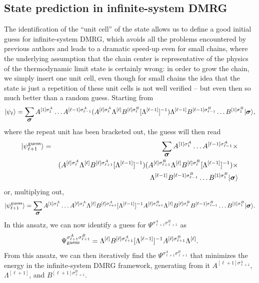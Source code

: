 \documentclass[a4paper,10pt,oneside,onecolumn,1p,times]{elsarticle}
\newcommand{\ket}[1]{\mbox{$| #1  \rangle$}}
\newcommand{\fat}[1]{\mbox{\boldmath$#1$\unboldmath}}	%
\begin{document}
\subsection{State prediction in infinite-system DMRG} 
The identification of the ``unit cell'' of the state allows us to define a good initial guess for infinite-system DMRG\cite{McCulloch08}, which avoids all the problems encountered by previous authors and leads to a dramatic speed-up even for small chains, where the underlying assumption that the chain center is representative of the physics of the thermodynamic limit state is certainly wrong: in order to grow the chain, we simply insert one unit cell, even though for small chains the idea that the state is just a repetition of these unit cells is not well verified -- but even then so much better than a random guess. Starting from
\begin{equation}
\ket{\psi_{\ell}} =  \sum_{\fat{\sigma}} A^{[1]\sigma_1^A} \ldots A^{[\ell-1]\sigma_{\ell-1}^A} (A^{[\ell]\sigma_\ell^A} \Lambda^{[\ell]} B^{[\ell]\sigma_\ell^B} [\Lambda^{[\ell-1]}]^{-1}) \Lambda^{[\ell-1]} B^{[\ell-1]\sigma_{\ell-1}^B} \ldots B^{[1]\sigma_1^B} \ket{\fat{\sigma}},
\end{equation} 
where the repeat unit has been bracketed out, the guess will then read
\begin{eqnarray}
\ket{\psi_{\ell+1}^{{\rm guess}}} &=& \sum_{\fat{\sigma}} A^{[1]\sigma_1^A} \ldots  A^{[\ell-1]\sigma_{\ell-1}^A} \times \nonumber \\
& & ( A^{[\ell]\sigma_\ell^A} \Lambda^{[\ell]} B^{[\ell]\sigma_{\ell+1}^A} [\Lambda^{[\ell-1]}]^{-1} ) (A^{[\ell]\sigma_{\ell+1}^B} \Lambda^{[\ell]} B^{[\ell]\sigma_\ell^B}  
[\Lambda^{[\ell-1]}]^{-1} ) \times \nonumber \\
& &  \Lambda^{[\ell-1]} B^{[\ell-1]\sigma_{\ell-1}^B} \ldots B^{[1]\sigma_1^B} \ket{\fat{\sigma}} 
\end{eqnarray}
or, multiplying out, 
\begin{equation}
\ket{\psi_{\ell+1}^{{\rm guess}}} = \sum_{\fat{\sigma}} A^{[1]\sigma_1^A} \ldots A^{[\ell]\sigma_\ell^A} \Lambda^{[\ell]} B^{[\ell]\sigma_{\ell+1}^A} [\Lambda^{[\ell-1]}]^{-1} A^{[\ell]\sigma_{\ell+1}^B} \Lambda^{[\ell]} B^{[\ell]\sigma_\ell^B} B^{[\ell-1]\sigma_{\ell-1}^B} \ldots B^{[1]\sigma_1^B} \ket{\fat{\sigma}} .
\end{equation}
In this ansatz, we can now identify a guess for $\Psi^{\sigma_{\ell+1}^A\sigma_{\ell+1}^B}$ as
\begin{equation}
\Psi^{\sigma_{\ell+1}^A\sigma_{\ell+1}^B}_{{\rm guess}} =
\Lambda^{[\ell]} B^{[\ell]\sigma_{\ell+1}^A} [\Lambda^{[\ell-1]}]^{-1} A^{[\ell]\sigma_{\ell+1}^B} \Lambda^{[\ell]} .
\label{eq:guess2sites}
\end{equation}
From this ansatz, we can then iteratively find the $\Psi^{\sigma_{\ell+1}^A\sigma_{\ell+1}^B}$ that minimizes the energy in the infinite-system DMRG framework, generating from it $A^{[\ell+1]\sigma_{\ell+1}^A}$, $\Lambda^{[\ell+1]}$, and $B^{[\ell+1]\sigma_{\ell+1}^B}$.
\end{document}
